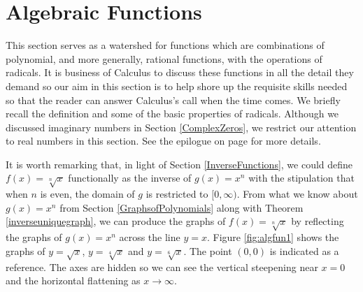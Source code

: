 \section{Algebraic Functions}

\label{AlgebraicFunctions}

This section serves as a watershed for functions which are combinations of polynomial, and more generally, rational functions, with the operations of radicals.  It is business of Calculus to discuss these functions in all the detail they demand so our aim in this section is to help shore up the requisite skills needed so that the reader can answer Calculus's call when the time comes.   We briefly recall the definition and some of the basic properties of radicals. Although we discussed imaginary numbers in Section \ref{ComplexZeros}, we restrict our attention to real numbers in this section.  See the epilogue on page \pageref{complexepilogue} for more details. 

\smallskip



\smallskip

It is worth remarking that, in light of Section \ref{InverseFunctions}, we could define $f(x) = \sqrt[n]{x}$ functionally as the inverse of $g(x) = x^n$ with the stipulation that when $n$ is even, the domain of $g$ is restricted to $[0, \infty)$. From what we know about $g(x) = x^n$ from Section \ref{GraphsofPolynomials} along with Theorem \ref{inverseuniquegraph}, we can produce the graphs of $f(x) = \sqrt[n]{x}$ by reflecting the graphs of $g(x) = x^n$ across the line $y=x$.  Figure \ref{fig:algfun1} shows the graphs of $y=\sqrt{x}$, $y=\sqrt[4]{x}$ and $y=\sqrt[6]{x}$.  The point $(0,0)$ is indicated as a reference.  The axes are hidden so we can see the vertical steepening near $x=0$ and the horizontal flattening as $x \rightarrow \infty$.

